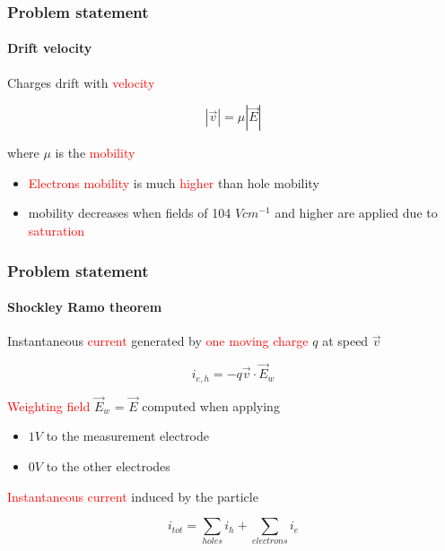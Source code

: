 \documentclass[14pt]{beamer}
\begin{document}
\begin{frame}
  \frametitle{Problem statement}
  \framesubtitle{Drift velocity}

  Charges drift with \textcolor{red}{velocity}

  \[|\vec{v}| = \mu |\vec{E}|\]

  where  $\mu$ is the \textcolor{red}{mobility}

  \begin{itemize}
    \item \textcolor{red}{Electrons mobility} is much \textcolor{red}{higher} than hole mobility
    \item mobility decreases when fields of 104 $V cm^{-1}$ and higher are
    applied due to \textcolor{red}{saturation}

  \end{itemize}
\end{frame}

\begin{frame}
  \frametitle{Problem statement}
  \framesubtitle{Shockley Ramo theorem}

   Instantaneous \textcolor{red}{current} generated	by \textcolor{red}{one moving charge} $q$ at speed $\vec{v}$

		\[i_{e,h} = -q \vec{v} \cdot \vec{E}_w\]

	\textcolor{red}{Weighting field} $\vec{E}_w$ = $\vec{E}$ computed when applying

\begin{itemize}
  \item $1V$ to the measurement electrode
	\item $0V$ to the other electrodes
\end{itemize}

\textcolor{red}{Instantaneous current} induced by the particle

\[i_{tot} = \sum_{holes} i_h + \sum_{electrons} i_e\]
\end{frame}
\end{document}
